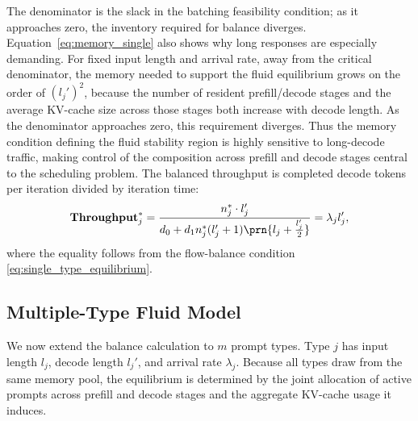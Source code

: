 The denominator is the slack in the batching feasibility condition; as it approaches zero, the inventory required for balance diverges. Equation~\eqref{eq:memory_single} also shows why long responses are especially demanding. For fixed input length and arrival rate, away from the critical denominator, the memory needed to support the fluid equilibrium grows on the order of \((l_j')^2\), because the number of resident prefill/decode stages and the average KV-cache size across those stages both increase with decode length. As the denominator approaches zero, this requirement diverges. Thus the memory condition defining the fluid stability region is highly sensitive to long-decode traffic, making control of the composition across prefill and decode stages central to the scheduling problem.
The balanced throughput is completed decode tokens per iteration divided by iteration time:
\begin{equation}\label{eq:throughput_fluid}
\throughput_j^* = \frac{n_j^* \cdot l_j'}{d_0+d_1n_j^*(l_j'+1)\prn{l_j+\frac{l_j'}{2}}} = \lambda_j l_j',
\end{equation}
where the equality follows from the flow-balance condition \eqref{eq:single_type_equilibrium}.

\subsection{Multiple-Type Fluid Model}
We now extend the balance calculation to \(m\) prompt types. Type \(j\) has input length \(l_j\), decode length \(l_j'\), and arrival rate \(\lambda_j\). Because all types draw from the same memory pool, the equilibrium is determined by the joint allocation of active prompts across prefill and decode stages and the aggregate KV-cache usage it induces.

